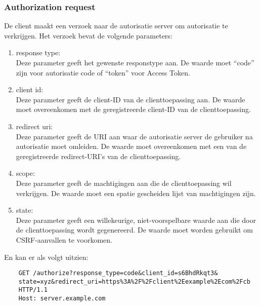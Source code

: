 \subsubsection{Authorization request}%
\label{subsubsec:authorization-request}
De client maakt een verzoek naar de autorisatie server om autorisatie te verkrijgen. Het verzoek bevat de volgende parameters:
\begin{enumerate}[label=\textbf{-}]
    \item response type: \\
    Deze parameter geeft het gewenste responstype aan. De waarde moet ``code'' zijn voor autorisatie code of ``token'' voor Access Token.
  
    \item client id: \\
    Deze parameter geeft de client-ID van de clienttoepassing aan. De waarde moet overeenkomen met de geregistreerde client-ID van de clienttoepassing.
  
    \item redirect uri: \\
    Deze parameter geeft de URI aan waar de autorisatie server de gebruiker na autorisatie moet omleiden. De waarde moet overeenkomen met een van de geregistreerde redirect-URI's van de clienttoepassing.
  
    \item scope: \\
    Deze parameter geeft de machtigingen aan die de clienttoepassing wil verkrijgen. De waarde moet een spatie gescheiden lijst van machtigingen zijn.
  
    \item state: \\
    Deze parameter geeft een willekeurige, niet-voorspelbare waarde aan die door de clienttoepassing wordt gegenereerd. De waarde moet worden gebruikt om CSRF-aanvallen te voorkomen.
  \end{enumerate}
  En kan er als volgt uitzien:
  \begin{verbatim}
    GET /authorize?response_type=code&client_id=s6BhdRkqt3&
    state=xyz&redirect_uri=https%3A%2F%2Fclient%2Eexample%2Ecom%2Fcb
    HTTP/1.1
    Host: server.example.com
  \end{verbatim}

